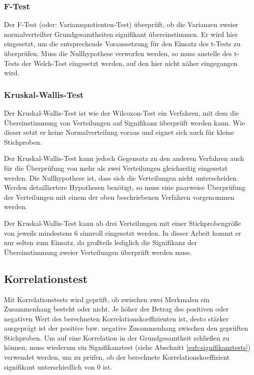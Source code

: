 
\subsubsection{F-Test} %
\label{ssub:f_test}

Der F-Test (oder: Varianzquotienten-Test) überprüft, ob die Varianzen zweier normalverteilter Grundgesamtheiten signifikant übereinstimmen. Er wird hier eingesetzt, um die entsprechende Voraussetzung für den Einsatz des t-Tests zu überprüfen. Muss die Nullhypothese verworfen werden, so muss anstelle des t-Tests der Welch-Test eingesetzt werden, auf den hier nicht näher eingegangen wird. \citep{Duller08}


\subsubsection{Kruskal-Wallis-Test} %
\label{ssub:kruskal_wallis_test}

Der Kruskal-Wallis-Test ist wie der Wilcoxon-Test ein Verfahren, mit dem die Übereinstimmung von Verteilungen auf Signifikanz überprüft werden kann. Wie dieser setzt er keine Normalverteilung voraus und eignet sich auch für kleine Stichproben. 

Der Kruskal-Wallis-Test kann jedoch Gegensatz zu den anderen Verfahren auch für die Überprüfung von mehr als zwei Verteilungen gleichzeitig eingesetzt werden. Die Nullhypothese ist, dass sich die Verteilungen nicht unterscheiden. Werden detailliertere Hypothesen benötigt, so muss eine paarweise Überprüfung der Verteilungen mit einem der oben beschriebenen Verfahren vorgenommen werden.  \citep{Duller08}

Der Kruskal-Wallis-Test kann ab drei Verteilungen mit einer Stichprobengröße von jeweils mindestens 6 sinnvoll eingesetzt werden. In dieser Arbeit kommt er nur selten zum Einsatz, da großteils lediglich die Signifikanz der Übereinstimmung zweier Verteilungen überprüft werden muss.


\subsection{Korrelationstest} %
\label{sub:korrelationstest}

Mit Korrelationstests wird geprüft, ob zwischen zwei Merkmalen ein Zusammenhang besteht oder nicht. Je höher der Betrag des positiven oder negativen Wert des berechneten Korrelationskoeffizienten ist, desto stärker ausgeprägt ist der positive bzw. negative Zusammenhang zwischen den geprüften Stichproben. Um auf eine Korrelation in der Grundgesamtheit schließen zu können, muss wiederum ein Signifikanztest (siehe Abschnitt \ref{sub:signifikanztests}) verwendet werden, um zu prüfen, ob der berechnete Korrelationskoeffizient signifikant unterschiedlich von 0 ist.

